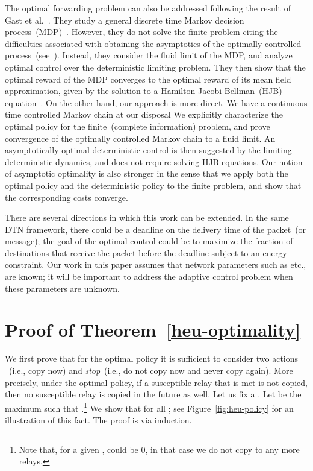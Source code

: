 \documentclass[10pt,journal,letterpaper]{IEEEtran}
\newcommand{\remove}[1]{}
\begin{document}
The optimal forwarding problem can also be addressed following the
result of Gast et al.~\cite{stochctrl.gast-etal10mean-field-MDPs}.
They study a general discrete time Markov decision process~(MDP)~\cite{stochctrl.bertsekas07dpoc-vol2}.
However, they do not solve the finite problem citing the difficulties
associated with obtaining the asymptotics of the optimally controlled
process~(see~\cite[Section~3.3]{stochctrl.gast-etal10mean-field-MDPs}).
Instead, they consider the fluid limit
of the MDP, and analyze optimal control over the deterministic limiting problem.
They then show that the optimal reward of the MDP converges to the optimal reward of its
mean field approximation, given by the solution to a Hamilton-Jacobi-Bellman~(HJB)
equation~\cite[Section~3.2]{stochctrl.bertsekas05dpoc-vol1}.
On the other hand, our approach is more direct.
We have a continuous time controlled Markov chain at our disposal
We explicitly characterize the optimal policy for the finite~(complete information) problem,
and prove convergence of the optimally controlled Markov chain to a fluid limit.
An asymptotically optimal deterministic control is then suggested by the limiting deterministic dynamics,
and does not require solving HJB equations. Our notion of asymptotic optimality is also stronger in the
sense that we apply both the optimal policy and the deterministic policy to the finite problem, and show that
the corresponding costs converge.

There are several directions in which this work can be extended.
In the same DTN framework, there could be a deadline on the delivery time of the packet~(or message);
the goal of the optimal control could be to maximize the fraction of destinations that receive
the packet before the deadline subject to an energy constraint. Our work in this paper
assumes that network parameters such as  etc., are known;
it will be important to address the adaptive control problem when these parameters are unknown.

\appendices
\section{Proof of Theorem~\ref{heu-optimality}}
\label{proof-heu-optimality}

We first prove that for the optimal policy it is sufficient to consider two
actions ~(i.e., copy now) and {\it stop}~(i.e., do not copy now and never copy again).
More precisely, under the optimal policy, if a susceptible relay
that is met is not copied, then no susceptible relay is copied in the future as well.
Let us fix a . Let   be the maximum 
such that .\footnote{Note that, for a given ,   could be 0,
in that case we do not copy to any more relays.}
We show that  for all ; see Figure~\ref{fig:heu-policy}
for an illustration of this fact.
The proof is via induction.
\remove{
Let us assume that  for all . The following results completes the induction step.
}
\end{document}
